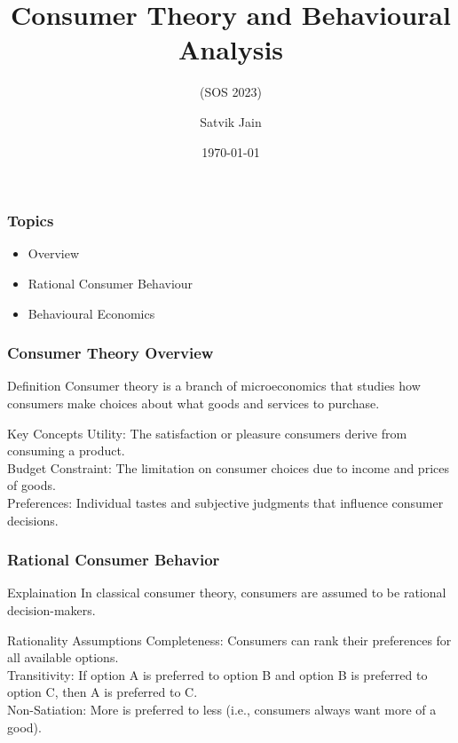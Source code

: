 \documentclass{beamer}
\title{Consumer Theory and Behavioural Analysis}
\subtitle{(SOS 2023)}
\author{Satvik Jain}
\date{\today}
\begin{document}
\begin{frame}
    \titlepage
\end{frame}



\begin{frame}
    \frametitle{Topics}
    \begin{itemize}
        \item Overview
        \item Rational Consumer Behaviour
        \item Behavioural Economics
    \end{itemize}
\end{frame}

\begin{frame}
    \frametitle{Consumer Theory Overview}
    \begin{block}{Definition}
        Consumer theory is a branch of microeconomics that studies how consumers make choices about what goods and services to purchase.
    \end{block}
    \begin{block}{Key Concepts}
Utility: The satisfaction or pleasure consumers derive from consuming a product.\\
Budget Constraint: The limitation on consumer choices due to income and prices of goods.\\
Preferences: Individual tastes and subjective judgments that influence consumer decisions.
    \end{block}
\end{frame}


\begin{frame}
    \frametitle{Rational Consumer Behavior}
    \begin{block}{Explaination}
         In classical consumer theory, consumers are assumed to be rational decision-makers.
    \end{block}
    \begin{block}{Rationality Assumptions}
Completeness: Consumers can rank their preferences for all available options.\\
Transitivity: If option A is preferred to option B and option B is preferred to option C, then A is preferred to C.\\
Non-Satiation: More is preferred to less (i.e., consumers always want more of a good).
    \end{block}
\end{frame}
\end{document}
